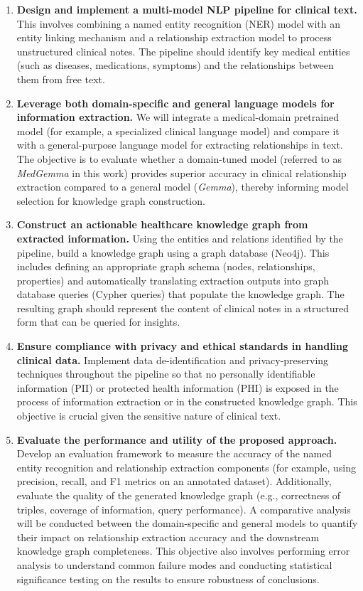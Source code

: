 \begin{enumerate}
\item \textbf{Design and implement a multi-model NLP pipeline for clinical text.} This involves combining a named entity recognition (NER) model with an entity linking mechanism and a relationship extraction model to process unstructured clinical notes. The pipeline should identify key medical entities (such as diseases, medications, symptoms) and the relationships between them from free text.

\item \textbf{Leverage both domain-specific and general language models for information extraction.} We will integrate a medical-domain pretrained model (for example, a specialized clinical language model) and compare it with a general-purpose language model for extracting relationships in text. The objective is to evaluate whether a domain-tuned model (referred to as \emph{MedGemma} in this work) provides superior accuracy in clinical relationship extraction compared to a general model (\emph{Gemma}), thereby informing model selection for knowledge graph construction.

\item \textbf{Construct an actionable healthcare knowledge graph from extracted information.} Using the entities and relations identified by the pipeline, build a knowledge graph using a graph database (Neo4j). This includes defining an appropriate graph schema (nodes, relationships, properties) and automatically translating extraction outputs into graph database queries (Cypher queries) that populate the knowledge graph. The resulting graph should represent the content of clinical notes in a structured form that can be queried for insights.

\item \textbf{Ensure compliance with privacy and ethical standards in handling clinical data.} Implement data de-identification and privacy-preserving techniques throughout the pipeline so that no personally identifiable information (PII) or protected health information (PHI) is exposed in the process of information extraction or in the constructed knowledge graph. This objective is crucial given the sensitive nature of clinical text.

\item \textbf{Evaluate the performance and utility of the proposed approach.} Develop an evaluation framework to measure the accuracy of the named entity recognition and relationship extraction components (for example, using precision, recall, and F1 metrics on an annotated dataset). Additionally, evaluate the quality of the generated knowledge graph (e.g., correctness of triples, coverage of information, query performance). A comparative analysis will be conducted between the domain-specific and general models to quantify their impact on relationship extraction accuracy and the downstream knowledge graph completeness. This objective also involves performing error analysis to understand common failure modes and conducting statistical significance testing on the results to ensure robustness of conclusions.
\end{enumerate}

